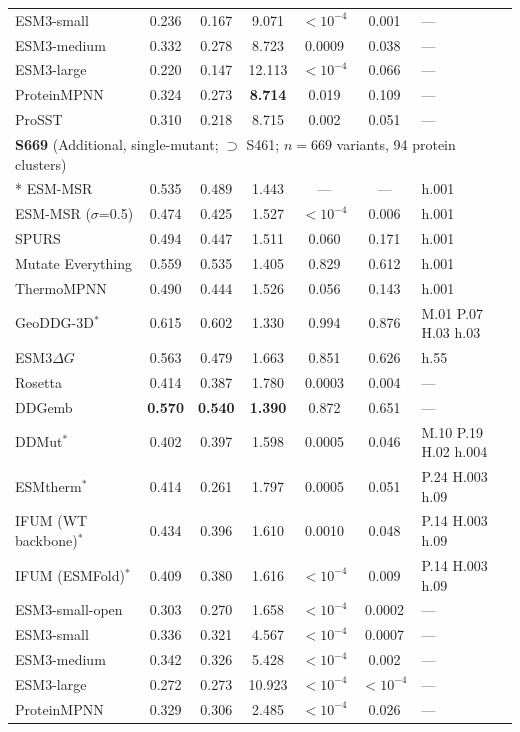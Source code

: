 {\begin{longtable}{lcccccl}
ESM3-small & 0.236 & 0.167 & 9.071 & $<10^{-4}$ & 0.001 & --- \\
ESM3-medium & 0.332 & 0.278 & 8.723 & 0.0009 & 0.038 & --- \\
ESM3-large & 0.220 & 0.147 & 12.113 & $<10^{-4}$ & 0.066 & --- \\
ProteinMPNN & 0.324 & 0.273 & \textbf{8.714} & 0.019 & 0.109 & --- \\
ProSST & 0.310 & 0.218 & 8.715 & 0.002 & 0.051 & --- \\
\midrule
\multicolumn{7}{l}{\textbf{S669} (Additional, single-mutant; $\supset$ S461; $n=669$ variants, 94 protein clusters)} \\*
\midrule
ESM-MSR & 0.535 & 0.489 & 1.443 & --- & --- & h.001 \\
ESM-MSR ($\sigma$=0.5) & 0.474 & 0.425 & 1.527 & $<10^{-4}$ & 0.006 & h.001 \\
SPURS & 0.494 & 0.447 & 1.511 & 0.060 & 0.171 & h.001 \\
Mutate Everything & 0.559 & 0.535 & 1.405 & 0.829 & 0.612 & h.001 \\
ThermoMPNN & 0.490 & 0.444 & 1.526 & 0.056 & 0.143 & h.001 \\
GeoDDG-3D$^*$ & 0.615 & 0.602 & 1.330 & 0.994 & 0.876 & M.01 P.07 H.03 h.03 \\
ESM3$\Delta G$ & 0.563 & 0.479 & 1.663 & 0.851 & 0.626 & h.55 \\
Rosetta & 0.414 & 0.387 & 1.780 & 0.0003 & 0.004 & --- \\
DDGemb & \textbf{0.570} & \textbf{0.540} & \textbf{1.390} & 0.872 & 0.651 & --- \\
DDMut$^*$ & 0.402 & 0.397 & 1.598 & 0.0005 & 0.046 & M.10 P.19 H.02 h.004 \\
ESMtherm$^*$ & 0.414 & 0.261 & 1.797 & 0.0005 & 0.051 & P.24 H.003 h.09 \\
IFUM (WT backbone)$^*$ & 0.434 & 0.396 & 1.610 & 0.0010 & 0.048 & P.14 H.003 h.09 \\
IFUM (ESMFold)$^*$ & 0.409 & 0.380 & 1.616 & $<10^{-4}$ & 0.009 & P.14 H.003 h.09 \\
ESM3-small-open & 0.303 & 0.270 & 1.658 & $<10^{-4}$ & 0.0002 & --- \\
ESM3-small & 0.336 & 0.321 & 4.567 & $<10^{-4}$ & 0.0007 & --- \\
ESM3-medium & 0.342 & 0.326 & 5.428 & $<10^{-4}$ & 0.002 & --- \\
ESM3-large & 0.272 & 0.273 & 10.923 & $<10^{-4}$ & $<10^{-4}$ & --- \\
ProteinMPNN & 0.329 & 0.306 & 2.485 & $<10^{-4}$ & 0.026 & --- \\

\end{longtable}}
